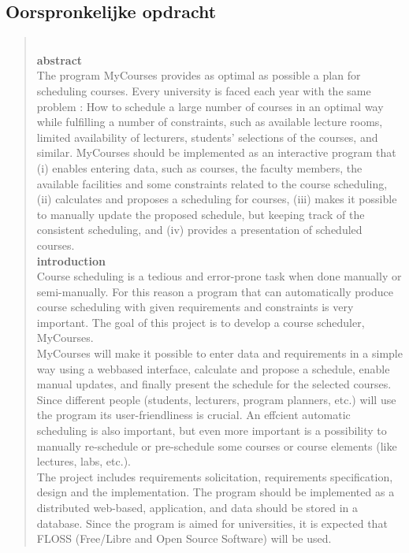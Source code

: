 \documentclass{article}
\begin{document}


\subsection{Oorspronkelijke opdracht}
\begin{quotation}
\\
\textbf{abstract}\\
The program MyCourses provides as optimal as possible a plan for scheduling courses. Every university is faced each year with the same problem : How to schedule a large number of courses in an optimal way while fulfilling a number of constraints, such as available lecture rooms, limited availability of lecturers, students' selections of the courses, and similar. MyCourses should be implemented as an interactive program that (i) enables entering data, such as courses, the faculty members, the available facilities and some constraints related to the course scheduling, (ii) calculates and proposes a scheduling for courses, (iii) makes it possible to manually update the proposed schedule, but keeping track of the consistent scheduling, and (iv) provides a presentation of scheduled courses.\\[3mm]
\textbf{introduction}\\
Course scheduling is a tedious and error-prone task when done manually or semi-manually. For this reason a program that can automatically produce course scheduling with given requirements and constraints is very important. The goal of this project is to develop a course scheduler, MyCourses.\\
MyCourses will make it possible to enter data and requirements in a simple way using a webbased interface, calculate and propose a schedule, enable manual updates, and finally present the schedule for the selected courses. Since different people (students, lecturers, program planners, etc.) will use the program its user-friendliness is crucial. An effcient automatic scheduling is also important, but even more important is a possibility to manually re-schedule or pre-schedule some courses or course elements (like lectures, labs, etc.).\\ The project includes requirements solicitation, requirements specification, design and the implementation. The program should be implemented as a distributed web-based, application, and data should be stored in a database. Since the program is aimed for universities, it is expected that FLOSS (Free/Libre and Open Source Software) will be used.\\[3mm]

\end{quotation}
\end{document}
